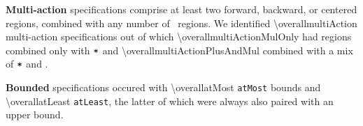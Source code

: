 \textbf{Multi-action} specifications comprise at least two
 forward, backward, or centered regions, combined with
any number of \pointed\ regions. We identified \num{\overallmultiAction} multi-action
specifications out of which \num{\overallmultiActionMulOnly} had regions combined only with
$\texttt{*}$ and \num{\overallmultiActionPlusAndMul} combined with a mix of $\texttt{*}$ and \term{+}.

\textbf{Bounded} specifications occured with \num{\overallatMost}
\texttt{atMost} bounds and \num{\overallatLeast} \texttt{atLeast}, the latter of which were
always also paired with an upper bound.



